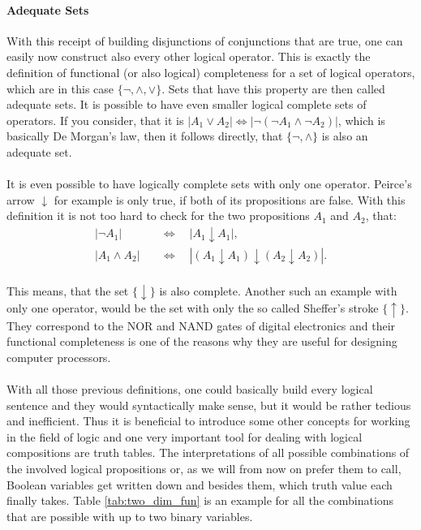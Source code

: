 \paragraph*{Adequate Sets}
With this receipt of building disjunctions of conjunctions that are true, one can easily now construct also every other logical operator. This is exactly the definition of functional (or also logical) completeness for a set of logical operators, which are in this case $ \{\neg,\land,\lor\} $. Sets that have this property are then called adequate sets. It is possible to have even smaller logical complete sets of operators. If you consider, that it is $ |A_1\lor A_2|\Leftrightarrow|\neg(\neg A_1\land\neg A_2)| $, which is basically De Morgan's law, then it follows directly, that $ \{\neg,\land\} $ is also an adequate set.

\paragraph*{}
It is even possible to have logically complete sets with only one operator. Peirce's arrow $ \downarrow $ for example is only true, if both of its propositions are false. With this definition it is not too hard to check for the two propositions $ A_1 $ and $ A_2 $, that:
\begin{align}
|\neg A_1| \quad &\Leftrightarrow\quad |A_1 \downarrow A_1|,\\
|A_1\land A_2| \quad &\Leftrightarrow\quad |(A_1\downarrow A_1)\downarrow(A_2\downarrow A_2)|.
\end{align}

\paragraph*{}
This means, that the set $ \{\downarrow \} $ is also complete. Another such an example with only one operator, would be the set with only the so called Sheffer's stroke $ \{\uparrow\} $. They correspond to the NOR and NAND gates of digital electronics and their functional completeness is one of the reasons why they are useful for designing computer processors.


\paragraph*{}
With all those previous definitions, one could basically build every logical sentence and they would syntactically make sense, but it would be rather tedious and inefficient. Thus it is beneficial to introduce some other concepts for working in the field of logic and one very important tool for dealing with logical compositions are truth tables. The interpretations of all possible combinations of the involved logical propositions or, as we will from now on prefer them to call, Boolean variables get written down and besides them, which truth value each finally takes. Table \ref{tab:two_dim_fun} is an example for all the combinations that are possible with up to two binary variables.

